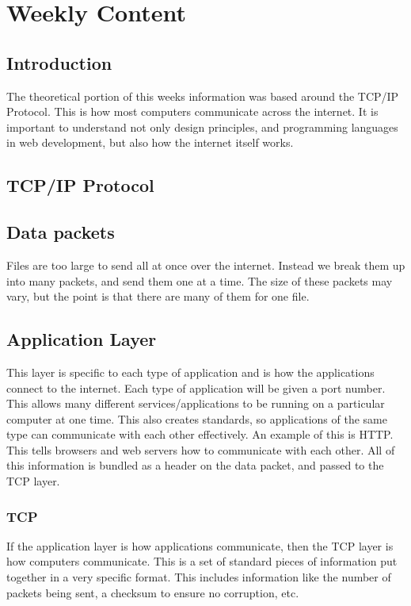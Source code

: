\documentclass[portfolio.tex]{subfiles}
\begin{document}


		\section{Weekly Content}
				\subsection{Introduction}
					The theoretical portion of this weeks information was based around the TCP/IP Protocol. This is how most computers communicate across the internet. It is important to understand not only design principles, and programming languages in web development, but also how the internet itself works.\\

			\subsection{TCP/IP Protocol}
				\subsection{Data packets}
					Files are too large to send all at once over the internet. Instead we break them up into many packets, and send them one at a time. The size of these packets may vary, but the point is that there are many of them for one file.\\

				\subsection{Application Layer}
					This layer is specific to each type of application and is how the applications connect to the internet. Each type of application will be given a port number. This allows many different services/applications to be running on a particular computer at one time. This also creates standards, so applications of the same type can communicate with each other effectively. An example of this is HTTP. This tells browsers and web servers how to communicate with each other. All of this information is bundled as a header on the data packet, and passed to the TCP layer. \autocite{stanford-internet}

				\subsubsection{TCP}
					If the application layer is how applications communicate, then the TCP layer is how computers communicate. This is a set of standard pieces of information put together in a very specific format. This includes information like the number of packets being sent, a checksum to ensure no corruption, etc.
\end{document}
